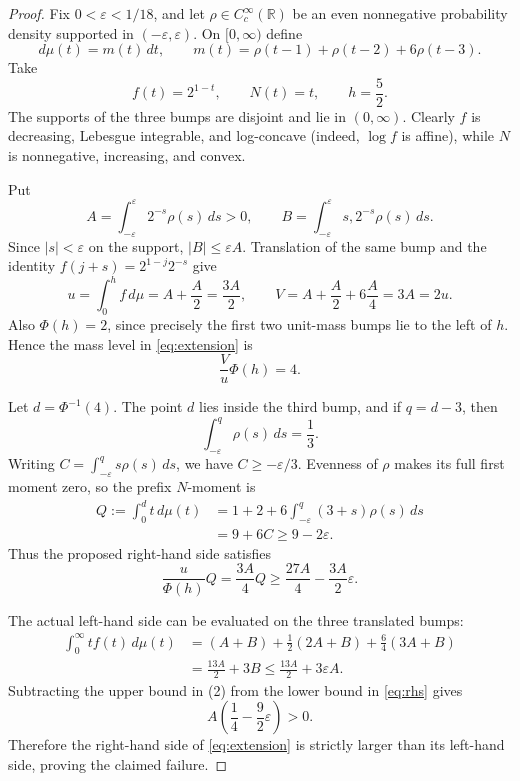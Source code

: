 \documentclass[11pt]{article}
\newcommand{\R}{\mathbb R}
\begin{document}
\begin{proof}
Fix $0<\varepsilon<1/18$, and let $\rho\in C_c^\infty(\R)$ be an even
nonnegative probability density supported in $(-\varepsilon,\varepsilon)$.
On $[0,\infty)$ define
\[
 d\mu(t)=m(t)\,dt,
 \qquad
 m(t)=\rho(t-1)+\rho(t-2)+6\rho(t-3).
\]
Take
\[
 f(t)=2^{1-t},\qquad N(t)=t,\qquad h=\frac52.
\]
The supports of the three bumps are disjoint and lie in $(0,\infty)$.
Clearly $f$ is decreasing, Lebesgue integrable, and log-concave (indeed,
$\log f$ is affine), while $N$ is nonnegative, increasing, and convex.

Put
\[
 A=\int_{-\varepsilon}^{\varepsilon}2^{-s}\rho(s)\,ds>0,
 \qquad
 B=\int_{-\varepsilon}^{\varepsilon}s,2^{-s}\rho(s)\,ds.
\]
Since $|s|<\varepsilon$ on the support, $|B|\leq\varepsilon A$.
Translation of the same bump and the identity
$f(j+s)=2^{1-j}2^{-s}$ give
\[
 u=\int_0^h f\,d\mu=A+\frac A2=\frac{3A}{2},
 \qquad
 V=A+\frac A2+6\frac A4=3A=2u.
\]
Also $\Phi(h)=2$, since precisely the first two unit-mass bumps lie to the
left of $h$.  Hence the mass level in \eqref{eq:extension} is
\[
 \frac Vu\Phi(h)=4.
\]

Let $d=\Phi^{-1}(4)$.  The point $d$ lies inside the third bump, and if
$q=d-3$, then
\[
 \int_{-\varepsilon}^{q}\rho(s)\,ds=\frac13.
\]
Writing $C=\int_{-\varepsilon}^{q}s\rho(s)\,ds$, we have
$C\geq-\varepsilon/3$.  Evenness of $\rho$ makes its full first moment zero,
so the prefix $N$-moment is
\begin{align*}
 Q:=\int_0^d t\,d\mu(t)
 &=1+2+6\int_{-\varepsilon}^{q}(3+s)\rho(s)\,ds\\
 &=9+6C\geq9-2\varepsilon.                         \tag{1}
\end{align*}
Thus the proposed right-hand side satisfies
\begin{equation}\label{eq:rhs}
 \frac{u}{\Phi(h)}Q
 =\frac{3A}{4}Q
 \geq \frac{27A}{4}-\frac{3A}{2}\varepsilon.
\end{equation}

The actual left-hand side can be evaluated on the three translated bumps:
\begin{align*}
 \int_0^\infty t f(t)\,d\mu(t)
 &=(A+B)+\frac12(2A+B)+\frac{6}{4}(3A+B)\\
 &=\frac{13A}{2}+3B
 \leq \frac{13A}{2}+3\varepsilon A.                \tag{2}
\end{align*}
Subtracting the upper bound in (2) from the lower bound in
\eqref{eq:rhs} gives
\[
 A\left(\frac14-\frac92\varepsilon\right)>0.
\]
Therefore the right-hand side of \eqref{eq:extension} is strictly larger
than its left-hand side, proving the claimed failure.
\end{proof}
\end{document}
